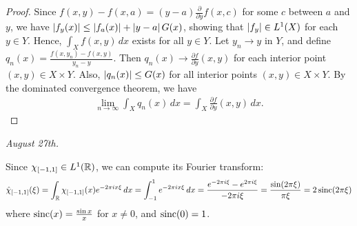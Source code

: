 \begin{proof}
    Since $f(x,y)-f(x,a) = (y-a)\frac{\partial}{\partial y}f(x,c)$ for some $c$ between $a$ and $y$, we have $\left| f_{y}(x) \right| \leq \left| f_{a}(x) \right| + \left| y-a \right|G(x)$, showing that $\left| f_{y} \right| \in L^{1}(X)$ for each $y \in Y$. Hence, $\int_{X} f(x,y) \, dx$ exists for all $y \in Y$. Let $y_{n} \to y$ in $Y$, and define $q_{n}(x) = \frac{f(x,y_{n})-f(x,y)}{y_{n}-y}$. Then $q_{n}(x) \to \frac{\partial f}{\partial y}(x,y)$ for each interior point $(x,y) \in X \times Y$. Also, $\left| q_{n}(x) \right| \leq G(x)$ for all interior points $(x,y) \in X \times Y$. By the dominated convergence theorem, we have
    \begin{align}
        \lim_{n \to \infty} \int_{X} q_{n}(x) \, dx = \int_{X} \frac{\partial f}{\partial y}(x,y) \, dx.
    \end{align}
\end{proof}

\textit{August 27th.}
\begin{example}
    Since $\chi_{[-1,1]} \in L^{1}(\mathbb{R})$, we can compute its Fourier transform:
    \begin{align}
        \hat{\chi}_{[-1,1]}(\xi) = \int_{\mathbb{R}} \chi_{[-1,1]}(x) e^{-2\pi i x \xi} \, dx = \int_{-1}^{1} e^{-2\pi i x \xi} \, dx = \frac{e^{-2\pi i \xi}-e^{2\pi i \xi}}{-2\pi i \xi} = \frac{\sin(2\pi \xi)}{\pi \xi} = 2 \operatorname{sinc}(2 \pi \xi)
    \end{align}
    where $\operatorname{sinc}(x) = \frac{\sin x}{x}$ for $x \neq 0$, and $\operatorname{sinc}(0) = 1$.    
\end{example}

